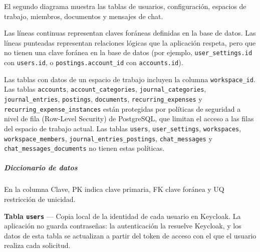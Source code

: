 El segundo diagrama muestra las tablas de usuarios, configuración,
espacios de trabajo, miembros, documentos y mensajes de chat.

Las líneas continuas representan claves foráneas definidas en la base de
datos. Las líneas punteadas representan relaciones lógicas que la
aplicación respeta, pero que no tienen una clave foránea en la base de
datos (por ejemplo, \texttt{user\_settings.id} con \texttt{users.id}, o
\texttt{postings.account\_id} con \texttt{accounts.id}).

Las tablas con datos de un espacio de trabajo incluyen la columna
\texttt{workspace\_id}. Las tablas \texttt{accounts},
\texttt{account\_categories}, \texttt{journal\_categories},
\texttt{journal\_entries}, \texttt{postings}, \texttt{documents},
\texttt{recurring\_expenses} y \texttt{recurring\_expense\_instances}
están protegidas por políticas de seguridad a nivel de fila (Row-Level
Security) de PostgreSQL, que limitan el acceso a las filas del espacio
de trabajo actual. Las tablas \texttt{users}, \texttt{user\_settings},
\texttt{workspaces}, \texttt{workspace\_members},
\texttt{journal\_entries\_postings}, \texttt{chat\_messages} y
\texttt{chat\_messages\_documents} no tienen estas políticas.

\subparagraph*{Diccionario de datos}\label{diccionario-de-datos}

En la columna Clave, PK indica clave primaria, FK clave foránea y UQ
restricción de unicidad.

\textbf{Tabla \texttt{users}} --- Copia local de la identidad de cada
usuario en Keycloak. La aplicación no guarda contraseñas: la
autenticación la resuelve Keycloak, y los datos de esta tabla se
actualizan a partir del token de acceso con el que el usuario realiza
cada solicitud.

